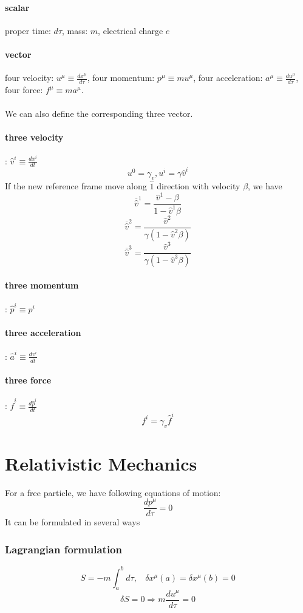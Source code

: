 \paragraph{scalar} proper time: $d \tau$, mass: $m$, electrical charge $e$
\paragraph{vector} four velocity: $u^{\mu} \equiv \frac{dx^{\mu}}{d \tau}$, four momentum: $p^{\mu} \equiv m u^{\mu}$, four acceleration: $a^{\mu} \equiv \frac{du^{\mu}}{d \tau}$, four force: $f^{\mu} \equiv m a^{\mu}$.\\ \\
We can also define the corresponding three vector.
\paragraph{three velocity}: $\hat{v}^{i} \equiv \frac{dx^i}{dt}$
\[u^0 = \gamma_v, u^i = \gamma \hat{v}^i\]
If the new reference frame move along $\hat{1}$ direction with velocity $\beta$, we have
\[\overline{\hat{v}}^1 = \frac{\hat{v}^1 - \beta}{1-\hat{v}^1 \beta}\]
\[\overline{\hat{v}}^2 = \frac{\hat{v}^2}{\gamma(1-\hat{v}^2 \beta)}\]
\[\overline{\hat{v}}^3 = \frac{\hat{v}^3}{\gamma(1-\hat{v}^3 \beta)}\]
\paragraph{three momentum}: $\hat{p}^{i} \equiv p^i$
\paragraph{three acceleration}: $\hat{a}^{i} \equiv \frac{dv^i}{dt}$
\paragraph{three force}: $\hat{f}^i \equiv \frac{d\hat{p}^i}{dt}$
\[f^i = \gamma_v \hat{f}^i\]

\section{Relativistic Mechanics}
For a free particle, we have following equations of motion:
\[\frac{dp^{\mu}}{d\tau} = 0\]
It can be formulated in several ways
\subsubsection{Lagrangian formulation}
\[S=-m\int_{a}^{b} d\tau, \ \ \ \ \delta x^{\mu}(a) = \delta x^{\mu}(b) = 0\]
\[\delta S = 0 \Rightarrow m\frac{du^{\mu}}{d\tau} = 0\]
